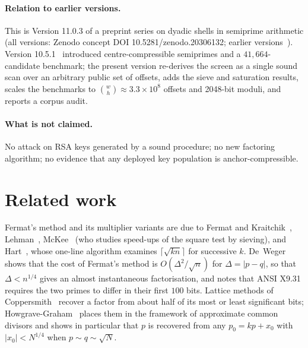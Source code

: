 \documentclass[11pt,a4paper]{article}
\begin{document}
\paragraph{Relation to earlier versions.} This is Version 11.0.3 of a preprint series on dyadic shells in semiprime arithmetic (all versions: Zenodo concept DOI 10.5281/zenodo.20306132; earlier versions~\cite{zenodoseries,zenodo5,zenodo10}). Version 10.5.1~\cite{zenodo10} introduced centre-compressible semiprimes and a $41{,}664$-candidate benchmark; the present version re-derives the screen as a single sound scan over an arbitrary public set of offsets, adds the sieve and saturation results, scales the benchmarks to $\binom{w}{h}\approx3.3\times10^{8}$ offsets and 2048-bit moduli, and reports a corpus audit.

\paragraph{What is not claimed.} No attack on RSA keys generated by a sound procedure; no new factoring algorithm; no evidence that any deployed key population is anchor-compressible.

\section{Related work}
Fermat's method and its multiplier variants are due to Fermat and Kraitchik~\cite{kraitchik}, Lehman~\cite{lehman}, McKee~\cite{mckee} (who studies speed-ups of the square test by sieving), and Hart~\cite{hart}, whose one-line algorithm examines $\lceil\sqrt{kn}\rceil$ for successive $k$. De~Weger~\cite{deweger} shows that the cost of Fermat's method is $O(\Delta^2/\sqrt n)$ for $\Delta=|p-q|$, so that $\Delta<n^{1/4}$ gives an almost instantaneous factorisation, and notes that ANSI X9.31 requires the two primes to differ in their first $100$ bits. Lattice methods of Coppersmith~\cite{copp96b,copp97} recover a factor from about half of its most or least significant bits; Howgrave-Graham~\cite{hg01} places them in the framework of approximate common divisors and shows in particular that $p$ is recovered from any $p_0=kp+x_0$ with $|x_0|<N^{1/4}$ when $p\sim q\sim\sqrt N$.
\end{document}
